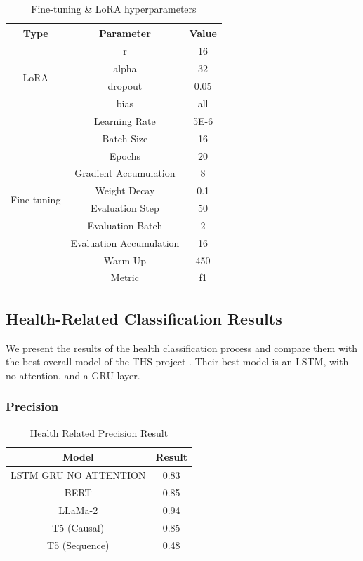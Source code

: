 \begin{table}[H]
	\centering
	\caption{Fine-tuning \& LoRA hyperparameters}
	{
	\begin{tabular}{||c | c | c||} 
		\hline
		\textbf{Type} & \textbf{Parameter} & \textbf{Value} \\
		\hline
		\multirow{4}{4.75em}{LoRA} & r & 16  \\ \cline{2-3}
		& alpha & 32  \\ \cline{2-3}
		& dropout & 0.05 \\ \cline{2-3}
		& bias & all \\
		\hline 
		\multirow{10}{4.75em}{Fine-tuning} & Learning Rate & 5E-6\\ \cline{2-3}
		& Batch Size & 16 \\ \cline{2-3}
		& Epochs & 20 \\ \cline{2-3}
		& Gradient Accumulation & 8 \\ \cline{2-3}
		& Weight Decay & 0.1 \\ \cline{2-3}
		& Evaluation Step & 50 \\ \cline{2-3}
		& Evaluation Batch & 2 \\ \cline{2-3}
		& Evaluation Accumulation & 16 \\ \cline{2-3}
		& Warm-Up & 450 \\ \cline{2-3}
		& Metric & f1 \\ \cline{2-3}
		\hline
	\end{tabular}
	}
	\label{table:hyperparameters}
\end{table}

\subsection{Health-Related Classification Results}
We present the results of the health classification process and compare them with the best overall model of the THS project \cite{8622504}.
Their best model is an LSTM, with no attention, and a GRU layer.

\subsubsection{Precision}
\begin{table}[htbp]
	\centering
	\caption{Health Related Precision Result}
	{
	\begin{tabular}{||c | c||} 
		\hline
		\textbf{Model} & \textbf{Result} \\ 
		\hline
		LSTM GRU NO ATTENTION & 0.83  \\
		\hline		
		BERT & 0.85  \\
		\hline
		LLaMa-2 & 0.94 \\ 
		\hline
		T5 (Causal) & 0.85 \\
		\hline
		T5 (Sequence) & 0.48 \\
		\hline
	\end{tabular}
	}
	\label{table:HealthPrecision}
\end{table}

